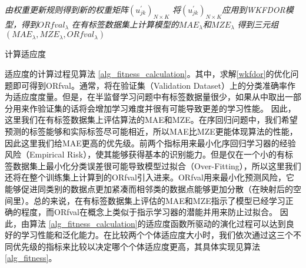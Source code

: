 \IncMargin{1em}
\begin{algorithm}[htb]
\BlankLine
\emph{由权重更新规则得到新的权重矩阵$(u_{jk}^{'})_{N \times K}$}\;
\emph{将$(u_{jk}^{'})_{N \times K}$应用到WKFDOR模型，得到$ORfval_{\lambda}$}\;
\emph{在有标签数据集上计算模型的$MAE_{\lambda}$和$MZE_{\lambda}$}\;
\emph{得到三元组$(MAE_{\lambda},MZE_{\lambda},ORfval_{\lambda})$}\;
\caption{计算适应度}\label{alg_fitness_calculation}
\end{algorithm}\DecMargin{1em}



适应度的计算过程见算法 \ref{alg_fitness_calculation}。其中，求解\autoref{wkfdor}的优化问题即可得到ORfval。通常，将在验证集（Validation Dataset）上的分类准确率作为适应度度量。但是，在半监督学习问题中有标签数据量很少，如果从中取出一部分用来作验证集的话将会增加学习难度并很有可能导致更差的学习性能。 因此，这里我们在有标签数据集上评估算法的MAE和MZE。在序回归问题中，我们希望预测的标签能够和实际标签尽可能相近，所以MAE比MZE更能体现算法的性能，因此这里我们给MAE更高的优先级。前两个指标用来最小化序回归学习器的经验风险（Empirical Risk），使其能够获得基本的识别能力。但是仅在一个小的有标签数据集上最小化分类误差很可能导致模型过拟合（Over-Fitting），所以这里我们还将在整个训练集上计算到的ORfval引入进来。ORfval用来最小化预测风险，它能够促进同类别的数据点更加紧凑而相邻类的数据点能够更加分散（在映射后的空间里）。总的来说，在有标签数据集上评估的MAE和MZE指示了模型已经学习正确的程度，而ORfval在概念上类似于指示学习器的潜能并用来防止过拟合\citep{liu2000evolutionary}\citep{liu2003evolutionary}。
因此，由算法 \ref{alg_fitness_calculation}的适应度函数所驱动的演化过程可以达到良好的学习性能和泛化能力。在比较两个个体适应度大小时，我们依次通过这三个不同优先级的指标来比较以决定哪个个体适应度更高，其具体实现见算法 \ref{alg_fitness}。


